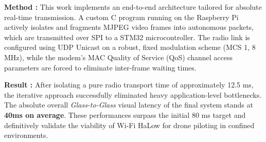 \textbf{Method :} This work implements an end-to-end architecture tailored for absolute real-time 
transmission. A custom C program running on the Raspberry Pi actively isolates and fragments 
MJPEG video frames into autonomous packets, which are transmitted over SPI to a STM32 microcontroller. 
The radio link is configured using UDP Unicast on a robust, fixed modulation scheme (MCS 1, 8 MHz), 
while the modem's MAC Quality of Service (QoS) channel access parameters are forced to eliminate 
inter-frame waiting times.

\textbf{Result :} After isolating a pure radio transport time of approximately 12.5 ms, the iterative 
approach successfully eliminated heavy application-level bottlenecks. The absolute overall 
\textit{Glass-to-Glass} visual latency of the final system stands at \textbf{40ms on average}. 
These performances surpass the initial 80 ms target and definitively validate the viability of Wi-Fi HaLow 
for drone piloting in confined environments.